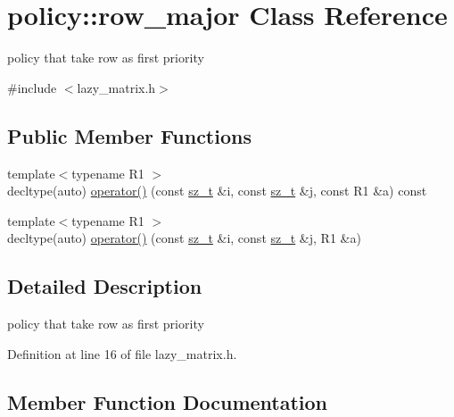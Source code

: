 \hypertarget{classpolicy_1_1row__major}{}\section{policy\+::row\+\_\+major Class Reference}
\label{classpolicy_1_1row__major}


policy that take row as first priority  




{\ttfamily \#include $<$lazy\+\_\+matrix.\+h$>$}

\subsection*{Public Member Functions}
\begin{DoxyCompactItemize}
\item 
{\footnotesize template$<$typename R1 $>$ }\\decltype(auto) \mbox{\hyperlink{classpolicy_1_1row__major_ad5b65c1a7a6451a8f3db2f03e6dbdf4a}{operator()}} (const \mbox{\hyperlink{lazy__matrix_8h_acba2745dcfc55b2d05ff45adc6a0a015}{sz\+\_\+t}} \&i, const \mbox{\hyperlink{lazy__matrix_8h_acba2745dcfc55b2d05ff45adc6a0a015}{sz\+\_\+t}} \&j, const R1 \&a) const
\item 
{\footnotesize template$<$typename R1 $>$ }\\decltype(auto) \mbox{\hyperlink{classpolicy_1_1row__major_afb0a6d8d4e6d8ae7ae47e5cfe6ae90d2}{operator()}} (const \mbox{\hyperlink{lazy__matrix_8h_acba2745dcfc55b2d05ff45adc6a0a015}{sz\+\_\+t}} \&i, const \mbox{\hyperlink{lazy__matrix_8h_acba2745dcfc55b2d05ff45adc6a0a015}{sz\+\_\+t}} \&j, R1 \&a)
\end{DoxyCompactItemize}


\subsection{Detailed Description}
policy that take row as first priority 

Definition at line 16 of file lazy\+\_\+matrix.\+h.



\subsection{Member Function Documentation}
\mbox{\label{classpolicy_1_1row__major_ad5b65c1a7a6451a8f3db2f03e6dbdf4a}} 
